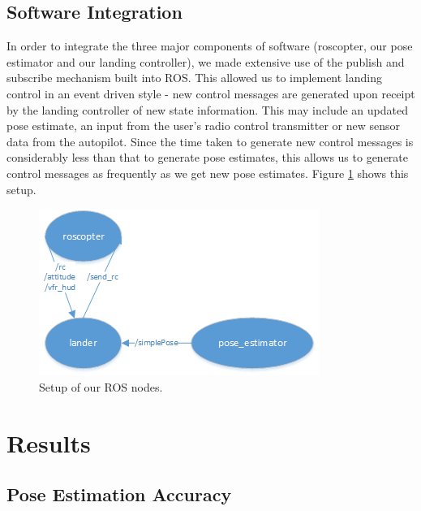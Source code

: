 \documentclass[10pt]{scrartcl} %
\begin{document}
\subsection{Software Integration}
In order to integrate the three major components of software (roscopter, our pose estimator and our landing controller), we made extensive use of the publish and subscribe mechanism built into ROS. This allowed us to implement landing control in an event driven style - new control messages are generated upon receipt by the landing controller of new state information. This may include an updated pose estimate, an input from the user's radio control transmitter or new sensor data from the autopilot. Since the time taken to generate new control messages is considerably less than that to generate pose estimates, this allows us to generate control messages as frequently as we get new pose estimates. Figure \ref{fig:rosnodes} shows this setup.

\begin{figure}[h]
    \centering
    \includegraphics{images/rosnodes.png}
    \caption{Setup of our ROS nodes.}
    \label{fig:rosnodes}
\end{figure}

\section{Results}

\subsection{Pose Estimation Accuracy}
\end{document}
